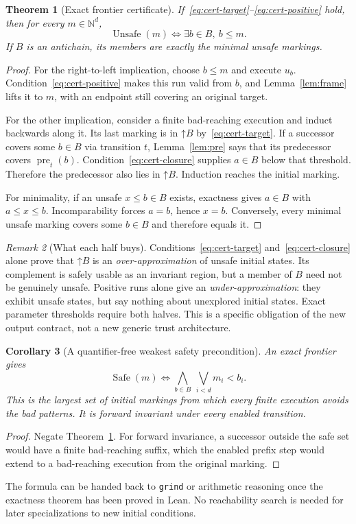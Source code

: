 \documentclass[11pt,a4paper]{article}
\newcommand{\N}{\mathbb N}
\newcommand{\Up}[1]{\mathord{\uparrow}#1}
\newcommand{\pre}{\operatorname{pre}}
\newcommand{\Unsafe}{\operatorname{Unsafe}}
\newcommand{\Safe}{\operatorname{Safe}}
\newcommand{\grind}{\texttt{grind}}
\newtheorem{theorem}{Theorem}[section]
\newtheorem{corollary}[theorem]{Corollary}
\theoremstyle{definition}
\theoremstyle{remark}
\newtheorem{remark}[theorem]{Remark}
\begin{document}
\begin{theorem}[Exact frontier certificate]\label{thm:exact}
If~\eqref{eq:cert-target}--\eqref{eq:cert-positive} hold, then for every $m\in\N^d$,
\[
 \Unsafe(m)\iff\exists b\in B,\ b\le m.
\]
If $B$ is an antichain, its members are exactly the minimal unsafe markings.
\end{theorem}
\begin{proof}
For the right-to-left implication, choose $b\le m$ and execute $u_b$. Condition~\eqref{eq:cert-positive} makes this run valid from $b$, and Lemma~\ref{lem:frame} lifts it to $m$, with an endpoint still covering an original target.

For the other implication, consider a finite bad-reaching execution and induct backwards along it. Its last marking is in $\Up{B}$ by~\eqref{eq:cert-target}. If a successor covers some $b\in B$ via transition $t$, Lemma~\ref{lem:pre} says that its predecessor covers $\pre_t(b)$. Condition~\eqref{eq:cert-closure} supplies $a\in B$ below that threshold. Therefore the predecessor also lies in $\Up{B}$. Induction reaches the initial marking.

For minimality, if an unsafe $x\le b\in B$ exists, exactness gives $a\in B$ with $a\le x\le b$. Incomparability forces $a=b$, hence $x=b$. Conversely, every minimal unsafe marking covers some $b\in B$ and therefore equals it.
\end{proof}

\begin{remark}[What each half buys]
Conditions~\eqref{eq:cert-target} and~\eqref{eq:cert-closure} alone prove that $\Up{B}$ is an \emph{over-approximation} of unsafe initial states. Its complement is safely usable as an invariant region, but a member of $B$ need not be genuinely unsafe. Positive runs alone give an \emph{under-approximation}: they exhibit unsafe states, but say nothing about unexplored initial states. Exact parameter thresholds require both halves. This is a specific obligation of the new output contract, not a new generic trust architecture.
\end{remark}

\begin{corollary}[A quantifier-free weakest safety precondition]\label{cor:safepre}
An exact frontier gives
\begin{equation}\label{eq:safepre}
 \Safe(m)\iff
 \bigwedge_{b\in B}\ \bigvee_{i<d} m_i<b_i.
\end{equation}
This is the largest set of initial markings from which every finite execution avoids the bad patterns. It is forward invariant under every enabled transition.
\end{corollary}
\begin{proof}
Negate Theorem~\ref{thm:exact}. For forward invariance, a successor outside the safe set would have a finite bad-reaching suffix, which the enabled prefix step would extend to a bad-reaching execution from the original marking.
\end{proof}
The formula can be handed back to \grind{} or arithmetic reasoning once the exactness theorem has been proved in Lean. No reachability search is needed for later specializations to new initial conditions.
\end{document}
